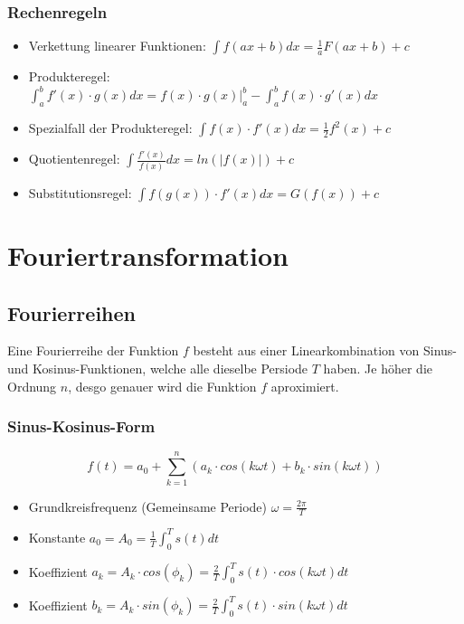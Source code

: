 \subsubsection{Rechenregeln}
\begin{itemize}
  \item Verkettung linearer Funktionen: $\int f(ax+b)dx = \frac{1}{a}F(ax+b) + c$
  \item Produkteregel: $\int_a^b f'(x) \cdot g(x) dx =
    f(x) \cdot g(x)|^b_a - \int_a^b f(x) \cdot g'(x) dx$
  \item Spezialfall der Produkteregel: $\int f(x) \cdot f'(x) dx = \frac{1}{2}f^2(x) + c$
  \item Quotientenregel: $\int \frac{f'(x)}{f(x)}dx = ln(|f(x)|) + c$
  \item Substitutionsregel: $ \int f(g(x)) \cdot f'(x) dx = G(f(x)) + c$
\end{itemize}


\section{Fouriertransformation}
\subsection{Fourierreihen}
Eine Fourierreihe der Funktion $f$ besteht aus einer Linearkombination
von Sinus- und Kosinus-Funktionen, welche alle dieselbe Persiode $T$
haben. Je höher die Ordnung $n$, desgo genauer wird die Funktion $f$ aproximiert.

\subsubsection{Sinus-Kosinus-Form}
\[
  f(t) = a_0 + \sum_{k=1}^{n}
  (a_k \cdot cos(k \omega t) + b_k \cdot sin(k \omega t))
\]
\begin{itemize}
  \item Grundkreisfrequenz (Gemeinsame Periode) $\omega = \frac{2\pi}{T}$
  \item Konstante $a_0 = A_0 = \frac{1}{T}\int_0^T s(t) dt$
  \item Koeffizient $a_k = A_k \cdot cos(\phi_k) =
    \frac{2}{T} \int_0^T s(t) \cdot cos(k \omega t) dt$
  \item Koeffizient $b_k = A_k \cdot sin(\phi_k) =
    \frac{2}{T} \int_0^T s(t) \cdot sin(k \omega t) dt$
\end{itemize}

